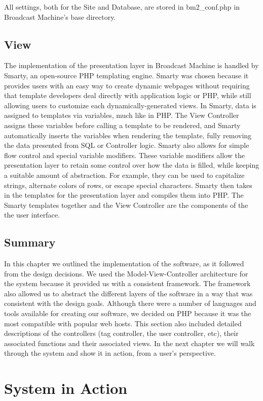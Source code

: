 \documentclass[a4paper,12pt]{report}
\begin{document}
All settings, both for the Site and Database, are stored in bm2\_conf.php in Broadcast Machine's base directory.

\section{View}
The implementation of the presentation layer in Broadcast Machine is handled by Smarty, an open-source PHP templating engine. 
Smarty was chosen because it provides users with an easy way to create dynamic webpages without requiring that template developers deal directly with application logic or PHP, while still allowing users to customize each dynamically-generated views. In Smarty, data is assigned to templates via variables, much like in PHP. The View Controller assigns these variables before calling a template to be rendered, and Smarty automatically inserts the variables when rendering the template, fully removing the data presented from SQL or Controller logic.
Smarty also allows for simple flow control and special variable modifiers.
These variable modifiers allow the presentation layer to retain some control over how the data is filled, while keeping a suitable amount of abstraction.
For example, they can be used to capitalize strings, alternate colors of rows, or escape special characters.
Smarty then takes in the templates for the presentation layer and compiles them into PHP. The Smarty templates together and the View Controller are the components of the the user interface.

\section{Summary}
In this chapter we outlined the implementation of the software, as it followed from the design decisions. We used the 
Model-View-Controller architecture for the system because it provided us with a consistent framework. The framework also allowed us to 
abstract the different layers of the software in a way that was consistent with the design goals. Although there were a number of 
languages and tools available for creating our software, we decided on PHP because it was the most compatible with popular web hosts. This 
section also included detailed descriptions of the controllers (tag controller, the user controller, etc), their associated functions and 
their associated views. In the next chapter we will walk through the system and show it in action, from a user's perspective. 

\chapter{System in Action}
\end{document}
